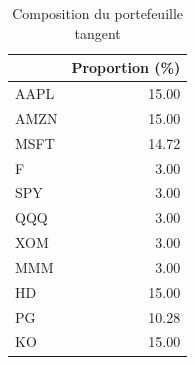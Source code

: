 \documentclass[
]{article}
\begin{document}
\begin{table}

\caption{\label{tab:unnamed-chunk-22}Composition du portefeuille tangent}
\centering
\begin{tabular}[t]{lr}
\toprule
  & Proportion (\%)\\
\midrule
AAPL & 15.00\\
AMZN & 15.00\\
MSFT & 14.72\\
F & 3.00\\
SPY & 3.00\\
\addlinespace
QQQ & 3.00\\
XOM & 3.00\\
MMM & 3.00\\
HD & 15.00\\
PG & 10.28\\
\addlinespace
KO & 15.00\\
\bottomrule
\end{tabular}
\end{table}
\end{document}
